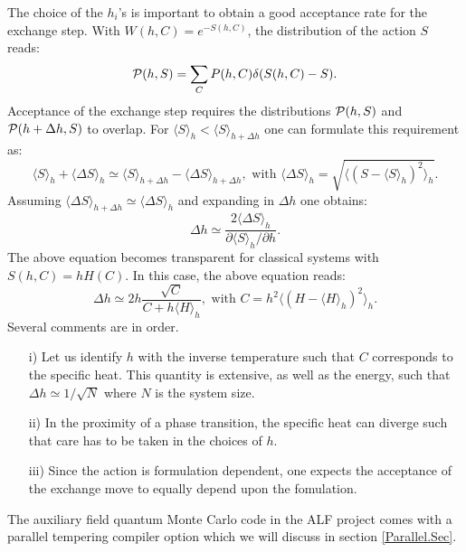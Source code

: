 The choice of the   $h_i$'s  is important  to  obtain a good acceptance rate for the exchange step.  With  $W(h,C)  = e^{- S(h,C) }$, the  distribution of the action $S$  reads:
\begin{equation}
	 {\cal P}( h, S ) =   \sum_{C}     P( h,C )   \delta ( S(h,C) -  S ). 
\end{equation} 
Acceptance of the exchange  step requires the distributions  ${ \cal P}( h, S )  $ and       ${ \cal P}( h  + \Delta h , S )  $ to overlap. For 
$\langle S \rangle_{h}  < \langle S \rangle_{h +  \Delta h} $   one can formulate this  requirement as:
\begin{equation}
	\langle S \rangle_{h}  +\langle \Delta S \rangle_{h}   \simeq \langle S \rangle_{h +  \Delta h}  - \langle \Delta S \rangle_{h + \Delta h} ,  \text{    with   }   
\langle \Delta S \rangle_{h}   =  \sqrt{ \langle \left(    S -  \langle S   \rangle_h  	\right)^2 \rangle_h} .
\end{equation}
Assuming  $ \langle \Delta S \rangle_{h + \Delta h}  \simeq \langle \Delta S \rangle_{h} $  and expanding in $\Delta h$ one obtains: 
\begin{equation}
	\Delta h \simeq \frac{ 2  \langle \Delta S \rangle_{h}    }{ \partial \langle S \rangle_{h} / \partial h}.  
\end{equation} 
The above equation becomes transparent  for  classical systems  with $ S(h,C) =  h H(C) $.  In this case, the above equation reads: 
\begin{equation}
	\Delta h       \simeq  2 h \frac{  \sqrt{C} } { C    + h \langle H \rangle_h},  \text{   with  } C = h^2    \langle \left(  H -  \langle H   \rangle_h \right)^2 \rangle_h .
\end{equation} 
Several comments are in order.
\begin{itemize}
\item[i)] Let us identify $h$ with the inverse temperature  such that $C$ corresponds to the specific heat. This quantity is extensive,  as well as the energy, such that $ \Delta h \simeq 1/{\sqrt{N}} $ where $N$ is the system size.
\item[ii)] In the proximity of a phase transition,   the specific heat can diverge such that   care has to be taken in the choices of  $h$.
\item[iii)]  Since the action is formulation dependent, one expects the acceptance of the  exchange move to equally depend  upon the fomulation. 
\end{itemize}
 The auxiliary field quantum Monte Carlo code in the ALF project  comes with a parallel tempering  compiler option which we will discuss  in section \ref{Parallel.Sec}. 
